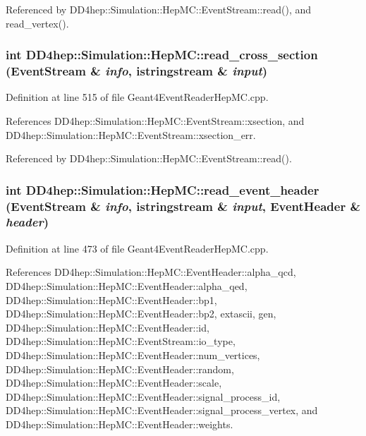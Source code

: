 Referenced by DD4hep::Simulation::HepMC::EventStream::read(), and read\_\-vertex().\hypertarget{namespace_d_d4hep_1_1_simulation_1_1_hep_m_c_a873025dee0b6f8a5ce8bd3485e518213}{
\subsubsection[{read\_\-cross\_\-section}]{\setlength{\rightskip}{0pt plus 5cm}int DD4hep::Simulation::HepMC::read\_\-cross\_\-section (EventStream \& {\em info}, \/  istringstream \& {\em input})}}
\label{namespace_d_d4hep_1_1_simulation_1_1_hep_m_c_a873025dee0b6f8a5ce8bd3485e518213}


Definition at line 515 of file Geant4EventReaderHepMC.cpp.

References DD4hep::Simulation::HepMC::EventStream::xsection, and DD4hep::Simulation::HepMC::EventStream::xsection\_\-err.

Referenced by DD4hep::Simulation::HepMC::EventStream::read().\hypertarget{namespace_d_d4hep_1_1_simulation_1_1_hep_m_c_aff50680cc4089a0f2c3b7a0218b3ed2e}{
\subsubsection[{read\_\-event\_\-header}]{\setlength{\rightskip}{0pt plus 5cm}int DD4hep::Simulation::HepMC::read\_\-event\_\-header (EventStream \& {\em info}, \/  istringstream \& {\em input}, \/  EventHeader \& {\em header})}}
\label{namespace_d_d4hep_1_1_simulation_1_1_hep_m_c_aff50680cc4089a0f2c3b7a0218b3ed2e}


Definition at line 473 of file Geant4EventReaderHepMC.cpp.

References DD4hep::Simulation::HepMC::EventHeader::alpha\_\-qcd, DD4hep::Simulation::HepMC::EventHeader::alpha\_\-qed, DD4hep::Simulation::HepMC::EventHeader::bp1, DD4hep::Simulation::HepMC::EventHeader::bp2, extascii, gen, DD4hep::Simulation::HepMC::EventHeader::id, DD4hep::Simulation::HepMC::EventStream::io\_\-type, DD4hep::Simulation::HepMC::EventHeader::num\_\-vertices, DD4hep::Simulation::HepMC::EventHeader::random, DD4hep::Simulation::HepMC::EventHeader::scale, DD4hep::Simulation::HepMC::EventHeader::signal\_\-process\_\-id, DD4hep::Simulation::HepMC::EventHeader::signal\_\-process\_\-vertex, and DD4hep::Simulation::HepMC::EventHeader::weights.

